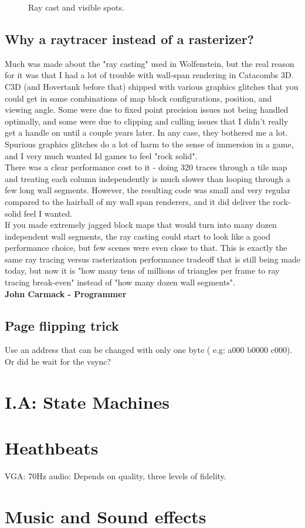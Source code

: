 \documentclass[book.tex]{subfiles}
\begin{document}
  
\begin{figure}[H]
  \centering
  
 \caption{Ray cast and visible spots.} 
\end{figure}

  
  
\subsection{Why a raytracer instead of a rasterizer?} 
\begin{fancyquotes}
Much was made about the "ray casting" used in Wolfenstein, but the real reason for it was that I had a lot of trouble with wall-span rendering in Catacombs 3D.  C3D (and Hovertank before that) shipped with various graphics glitches that you could get in some combinations of map block configurations, position, and viewing angle.  Some were due to fixed point precision issues not being handled optimally, and some were due to clipping and culling issues that I didn't really get a handle on until a couple years later.  In any case, they bothered me a lot.  Spurious graphics glitches do a lot of harm to the sense of immersion in a game, and I very much wanted Id games to feel "rock solid".
 \bigskip \\
There was a clear performance cost to it - doing 320 traces through a tile map and treating each column independently is much slower than looping through a few long wall segments.  However, the resulting code was small and very regular compared to the hairball of my wall span renderers, and it did deliver the rock-solid feel I wanted.
 \bigskip \\
If you made extremely jagged block maps that would turn into many dozen independent wall segments, the ray casting could start to look like a good performance choice, but few scenes were even close to that.  This is exactly the same ray tracing versus rasterization performance tradeoff that is still being made today, but now it is "how many tens of millions of triangles per frame to ray tracing break-even" instead of "how many dozen wall segments".
 \bigskip \\
\textbf{John Carmack - Programmer}
 \end{fancyquotes}
 \subsection{Page flipping trick}
 Use an address that can be changed with only one byte ( e.g: a000 b0000 c000).
 Or did he wait for the vsync?
\section{I.A: State Machines} 

\section{Heathbeats}
VGA: 70Hz
audio: Depends on quality, three levels of fidelity.

\section{Music and Sound effects} 
\end{document}
